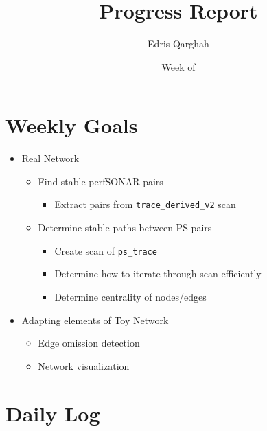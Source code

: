 \documentclass{weeklyreport}
\title{Progress Report}
\author{Edris Qarghah}
\date{Week of \DTMusedate{reportdate}}
\begin{document}
\maketitle

\newpage

\section*{Weekly Goals}


\begin{itemize}
	\item Real Network
	\begin{itemize}
		\item Find stable perfSONAR pairs
		\begin{itemize}
			\item Extract pairs from \texttt{trace\_derived\_v2} scan
		\end{itemize}
		\item Determine stable paths between PS pairs
		\begin{itemize}
			\item Create scan of \texttt{ps\_trace}
			\item Determine how to iterate through scan efficiently
			\item Determine centrality of nodes/edges
		\end{itemize}
	\end{itemize}
	\item Adapting elements of Toy Network
	\begin{itemize}
		\item Edge omission detection
		\item Network visualization
	\end{itemize}
\end{itemize}

\section*{Daily Log}

\subsection*{}
\end{document}
